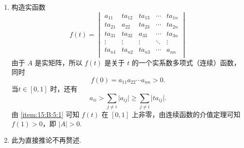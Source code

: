 \begin{exercise}
\begin{exgroup}
\begin{answer}
\begin{enumerate}
                \item 构造实函数
                      \[f(t) = \begin{vmatrix}
                              a_{11}  & ta_{12} & ta_{13} & \cdots & ta_{1n} \\
                              ta_{21} & a_{22}  & ta_{23} & \cdots & ta_{2n} \\
                              ta_{31} & ta_{32} & a_{33}  & \cdots & ta_{3n} \\
                              \vdots  & \vdots  & \vdots  & \ddots & \vdots  \\
                              ta_{n1} & ta_{n2} & ta_{n3} & \cdots & a_{nn}  \\
                          \end{vmatrix}\]
                      由于 $A$ 是实矩阵，所以 $f(t)$ 是关于 $t$ 的一个实系数多项式（连续）函数，同时
                      \[f(0) = a_{11}a_{22}\cdots a_{nn} > 0.\]
                      当$t \in [0, 1]$ 时，还有
                      \[a_{ii} > \sum_{j \neq i} \lvert a_{ij} \rvert \geqslant \sum_{j \neq i} \lvert ta_{ij} \rvert.\]
                      由 \ref*{item:15:B:5:1} 可知 $f(t)$ 在 $[0, 1]$ 上非零，由连续函数的介值定理可知 $f(1) > 0$，即 $\lvert A \rvert > 0$.

                \item 此为直接推论不再赘述.
            \end{enumerate}
        \end{answer}
    \end{exgroup}
\end{exercise}
